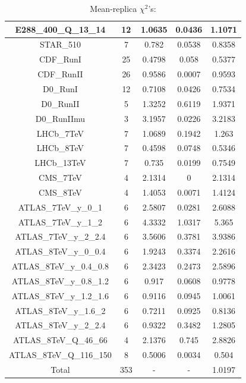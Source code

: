 \documentclass[
]{article}
\begin{document}
\begin{table}[h]
\begin{tabular}{|c|c|c|c|c|}
E288\_400\_Q\_13\_14 & 12 & 1.0635 & 0.0436 & 1.1071 \\ \hline
STAR\_510 & 7 & 0.782 & 0.0538 & 0.8358 \\ \hline
CDF\_RunI & 25 & 0.4798 & 0.058 & 0.5377 \\ \hline
CDF\_RunII & 26 & 0.9586 & 0.0007 & 0.9593 \\ \hline
D0\_RunI & 12 & 0.7108 & 0.0426 & 0.7534 \\ \hline
D0\_RunII & 5 & 1.3252 & 0.6119 & 1.9371 \\ \hline
D0\_RunIImu & 3 & 3.1957 & 0.0226 & 3.2183 \\ \hline
LHCb\_7TeV & 7 & 1.0689 & 0.1942 & 1.263 \\ \hline
LHCb\_8TeV & 7 & 0.4598 & 0.0748 & 0.5346 \\ \hline
LHCb\_13TeV & 7 & 0.735 & 0.0199 & 0.7549 \\ \hline
CMS\_7TeV & 4 & 2.1314 & 0 & 2.1314 \\ \hline
CMS\_8TeV & 4 & 1.4053 & 0.0071 & 1.4124 \\ \hline
ATLAS\_7TeV\_y\_0\_1 & 6 & 2.5807 & 0.0281 & 2.6088 \\ \hline
ATLAS\_7TeV\_y\_1\_2 & 6 & 4.3332 & 1.0317 & 5.365 \\ \hline
ATLAS\_7TeV\_y\_2\_2.4 & 6 & 3.5606 & 0.3781 & 3.9386 \\ \hline
ATLAS\_8TeV\_y\_0\_0.4 & 6 & 1.9243 & 0.3374 & 2.2616 \\ \hline
ATLAS\_8TeV\_y\_0.4\_0.8 & 6 & 2.3423 & 0.2473 & 2.5896 \\ \hline
ATLAS\_8TeV\_y\_0.8\_1.2 & 6 & 0.917 & 0.0608 & 0.9778 \\ \hline
ATLAS\_8TeV\_y\_1.2\_1.6 & 6 & 0.9116 & 0.0945 & 1.0061 \\ \hline
ATLAS\_8TeV\_y\_1.6\_2 & 6 & 0.7211 & 0.0925 & 0.8136 \\ \hline
ATLAS\_8TeV\_y\_2\_2.4 & 6 & 0.9322 & 0.3482 & 1.2805 \\ \hline
ATLAS\_8TeV\_Q\_46\_66 & 4 & 2.1376 & 0.745 & 2.8826 \\ \hline
ATLAS\_8TeV\_Q\_116\_150 & 8 & 0.5006 & 0.0034 & 0.504 \\ \hline
Total & 353 & - & - & 1.0197 \\ \hline

\end{tabular}

\caption{Mean-replica \(\chi^2\)'s:}

\end{table}
\end{document}
